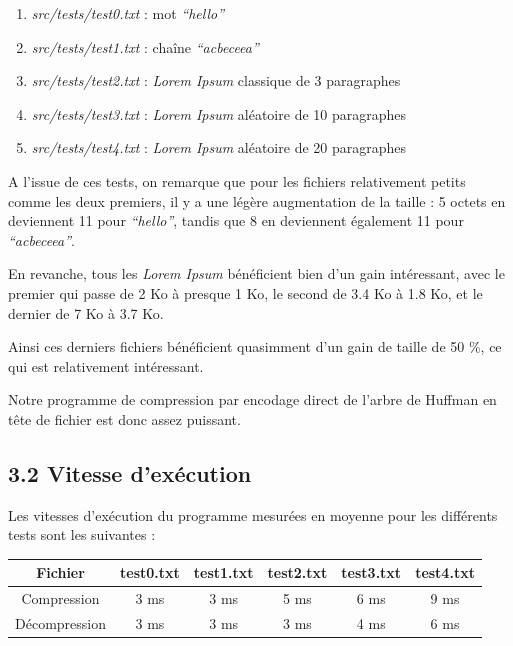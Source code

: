 \documentclass [a4paper,11pt] {report}
\begin{document}
\begin{enumerate}

\item%
\textit{src/tests/test0.txt} : mot \textit{``hello''}

\item%
\textit{src/tests/test1.txt} : chaîne \textit{``acbeceea''}

\item%
\textit{src/tests/test2.txt} : \textit{Lorem Ipsum} classique de 3 paragraphes

\item%
\textit{src/tests/test3.txt} : \textit{Lorem Ipsum} aléatoire de 10 paragraphes

\item%
\textit{src/tests/test4.txt} : \textit{Lorem Ipsum} aléatoire de 20 paragraphes

\end{enumerate}


A l'issue de ces tests, on remarque que pour les fichiers relativement petits comme les deux premiers, il y a une légère augmentation de la taille : 5 octets en deviennent 11 pour \textit{``hello''}, tandis que 8 en deviennent également 11 pour \textit{``acbeceea''}.

En revanche, tous les \textit{Lorem Ipsum} bénéficient bien d'un gain intéressant, avec le premier qui passe de 2 Ko à presque 1 Ko, le second de 3.4 Ko à 1.8 Ko, et le dernier de 7 Ko à 3.7 Ko.

Ainsi ces derniers fichiers bénéficient quasimment d'un gain de taille de 50 \%, ce qui est relativement intéressant.

Notre programme de compression par encodage direct de l'arbre de Huffman en tête de fichier est donc assez puissant.


\subsection* {3.2\hspace{3mm} Vitesse d'exécution}

Les vitesses d'exécution du programme mesurées en moyenne pour les différents tests sont les suivantes :
\begin{center}
\begin{tabular}{|c|c|c|c|c|c|}
 \hline
Fichier & test0.txt & test1.txt & test2.txt & test3.txt & test4.txt\\
 \hline
Compression & 3 ms & 3 ms & 5 ms & 6 ms & 9 ms\\
Décompression & 3 ms & 3 ms & 3 ms & 4 ms & 6 ms\\
 \hline
\end{tabular}
\end{center}
\end{document}
